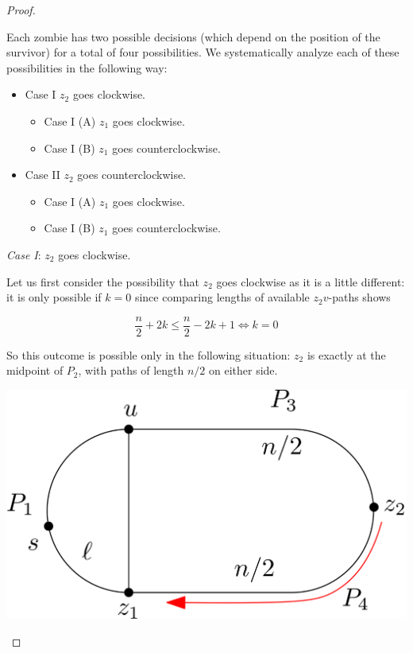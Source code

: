 \documentclass[letterpaper, 10pt]{article}
\begin{document}
\begin{proof}
\begin{proofpart}
Each zombie has two possible decisions (which depend on the position of the survivor)
for a total of four possibilities. We systematically analyze each of these possibilities
in the following way:

\begin{itemize}
  \item Case I $z_2$ goes clockwise.
  \begin{itemize}
    \item Case I (A) $z_1$ goes clockwise.
    \item Case I (B) $z_1$ goes counterclockwise.
  \end{itemize}
  \item Case II $z_2$ goes counterclockwise.
  \begin{itemize}
    \item Case I (A) $z_1$ goes clockwise.
    \item Case I (B) $z_1$ goes counterclockwise.
  \end{itemize}
\end{itemize}

\emph{Case I}: $z_2$ goes clockwise.

Let us first consider the possibility that
$z_2$ goes clockwise as it is a little different: it is only possible if $k=0$ since
comparing lengths of available $z_2v$-paths shows

\[\frac{n}{2} +2k \leq \frac{n}{2} -2k + 1\iff k=0 \]

So this outcome is possible only in the following situation: $z_2$ is exactly at the midpoint of $P_2$,
with paths of length $n/2$ on either side.

\begin{center}
\includegraphics[scale=0.15]{diagram7}
\end{center}


\end{proofpart}
\end{proof}
\end{document}
